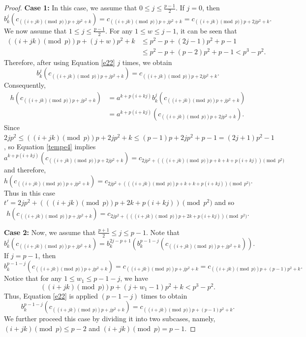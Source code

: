\documentclass[11pt]{amsart}
\theoremstyle{plain}
\numberwithin{equation}{section}
\begin{document}
\begin{proof}
\textbf{Case 1:} In this case, we assume that $ 0 \leq j \leq \frac{p-1}{2} $. If $j=0$, then 
\[
b_k^{j}(c_{\left((i+jk)\pmod  p\right)p+jp^2+k})=c_{\left((i+jk)\pmod  p\right)p+jp^2+k}=c_{\left((i+jk)\pmod  p\right)p+2jp^2+k}.
\]
We now assume that $ 1 \leq j \leq \frac{p-1}{2} $. For any $1 \leq w \leq j-1$, it can be seen that
\begin{equation*}
\begin{split}
\left((i+jk)\pmod  p\right)p+(j+w)p^2+k &\leq p^2-p+(2j-1)p^2+p-1\\&\leq p^2-p+(p-2)p^2+p-1< p^3-p^2.
\end{split}
\end{equation*}
Therefore, after using Equation \eqref{e22} $j$ times, we obtain 
 $$b_{k}^{j}(c_{\left((i+jk)\pmod  p\right)p+jp^2+k})=c_{\left((i+jk)\pmod  p\right)p+2jp^2+k}.$$
  Consequently, \begin{equation*}
  \begin{split}
h(c_{\left((i+jk)\pmod  p\right)p+jp^2+k})&=a^{k+p(i+kj)}b_k^{j}(c_{\left((i+jk)\pmod  p\right)p+jp^2+k})\\&=a^{k+p(i+kj)}(c_{\left((i+jk)\pmod  p\right)p+2jp^2+k}).
\end{split}
\end{equation*}
 Since $2jp^2 \leq \left((i+jk)\pmod  p\right)p+2jp^2+k \leq (p-1)p+2jp^2+p-1=(2j+1)p^2-1$, so Equation \eqref{tempe4} implies
\[
a^{k+p(i+kj)}(c_{\left((i+jk)\pmod  p\right)p+2jp^2+k})=c_{2jp^2+\left(\left((i+jk)\pmod  p\right)p+k+k+p(i+kj)\right) \pmod {p^2}} 
\]
and therefore,
\[
h(c_{\left((i+jk)\pmod  p\right)p+jp^2+k})=c_{2jp^2+\left(\left((i+jk)\pmod  p\right)p+k+k+p(i+kj)\right) \pmod {p^2}}. 
\]
Thus in this case $t'={2jp^2+\left(\left((i+jk)\pmod p\right)p+2k+p(i+kj)\right) \pmod {p^2}}$ and so
\[
  h(c_{\left((i+jk)\pmod  p\right)p+jp^2+k})=c_{2jp^2+\left(\left((i+jk)\pmod  p\right)p+2k+p(i+kj)\right) \pmod {p^2}}.
 \]
 

\textbf{Case 2:} Now, we assume that $ \frac{p+1}{2} \leq j \leq p-1 $. Note that
\[
b_{k}^{j}(c_{\left((i+jk)\pmod  p\right)p+jp^2+k})=b_{k}^{2j-p+1}(b_{k}^{p-1-j}(c_{\left((i+jk)\pmod  p\right)p+jp^2+k})).
\]
If $j=p-1$, then
\[
b_{k}^{p-1-j}(c_{\left((i+jk)\pmod  p\right)p+jp^2+k})=c_{\left((i+jk)\pmod  p\right)p+jp^2+k}=c_{\left((i+jk)\pmod  p\right)p+(p-1)p^2+k}.
\] 
Notice that for any $1 \leq w_1 \leq p-1-j$, we have
\[
\left((i+jk)\pmod  p\right)p+(j+w_1-1)p^2+k <p^3-p^2.
\] 
Thus, Equation \eqref{e22} is applied $(p-1-j)$ times to obtain
\[
b_{k}^{p-1-j}(c_{\left((i+jk)\pmod  p\right)p+jp^2+k})=c_{\left((i+jk)\pmod  p\right)p+(p-1)p^2+k}.
\]
 We further proceed this case by dividing it into two subcases, namely, $(i+jk)\pmod  p \leq p-2$ and $(i+jk)\pmod  p =p-1$. 


\end{proof}
\end{document}
